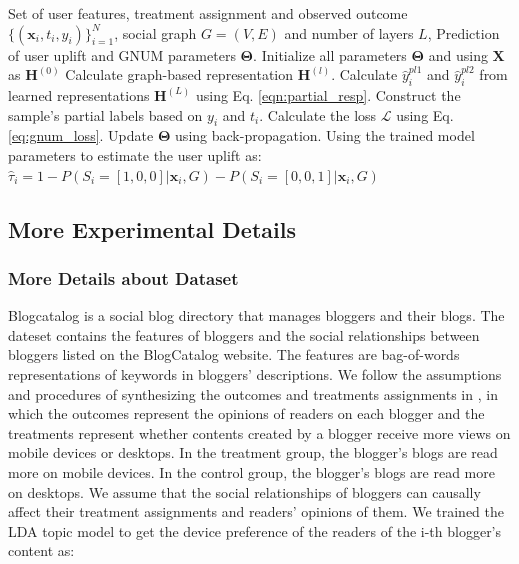 \begin{algorithm}[t]\caption{Graph Neural Network for Uplift Modeling (GNUM) using Partial Label Learning} \label{alg1}
	\begin{algorithmic}[1]
		\REQUIRE Set of user features, treatment assignment and observed outcome $\{(\mathbf{x}_i,t_i,y_i)\}_{i=1}^N$, social graph $\mathit{G}=(\mathit{V},\mathit{E})$ and number of layers $L$, 
		\ENSURE Prediction of user uplift and GNUM parameters $\mathbf{\Theta}$.
		\STATE Initialize all parameters $\mathbf{\Theta}$ and using $\mathbf{X}$ as $\mathbf{H}^{(0)}$
		\STATE Calculate graph-based representation $\mathbf{H}^{(l)}$.
		\ENDFOR
		\STATE Calculate  $\hat{y}_i^{pl1}$ and $\hat{y}_i^{pl2}$  from learned representations $\mathbf{H}^{(L)}$ using Eq. \eqref{eqn:partial_resp}.
		\STATE Construct the sample's partial labels based on $y_i$ and $t_i$.
		\STATE Calculate the loss $\mathcal{L}$ using Eq. \eqref{eq:gnum_loss}.
		\STATE Update $\mathbf{\Theta}$ using back-propagation.
		\ENDWHILE
		\STATE Using the trained model parameters to estimate the user uplift as: $\hat{\tau}_i = 1 - P(S_i=[1, 0, 0]|\mathbf{x}_i,\mathit{G}) - P(S_i=[0, 0, 1]|\mathbf{x}_i,\mathit{G})$
	\end{algorithmic}
\end{algorithm}



\subsection{More Experimental Details}
\subsubsection{More Details about Dataset}
\label{appn:dataset}
Blogcatalog is a social blog directory that manages bloggers and their blogs. The dateset contains 
the features of bloggers and the social relationships between bloggers listed on the BlogCatalog website. The features are bag-of-words representations of keywords in bloggers’ descriptions. 
We follow the assumptions and procedures
of synthesizing the outcomes and treatments assignments in \cite{guo2020learning}, in which the outcomes represent the opinions of readers on each
blogger and the treatments represent whether contents created by a blogger receive more views on mobile devices or desktops.
In the treatment group, the blogger’s blogs are read more on mobile devices. In the control group, the blogger’s blogs are read more on desktops. 
We assume that the social relationships of bloggers can causally affect their treatment assignments and readers’ opinions of them. 
We trained the LDA topic model to get the device
preference of the readers of the i-th blogger’s content as:

